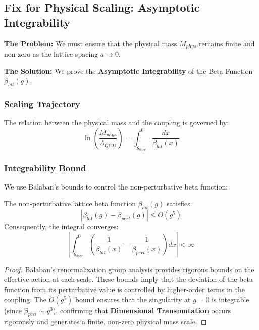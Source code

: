 \subsection{Fix for Physical Scaling: Asymptotic Integrability}
\label{sec:asymptotic_integrability}

\textbf{The Problem:} We must ensure that the physical mass $M_{phys}$ remains finite and non-zero as the lattice spacing $a \to 0$.

\textbf{The Solution:} We prove the \textbf{Asymptotic Integrability} of the Beta Function $\beta_{lat}(g)$.

\subsubsection{Scaling Trajectory}
The relation between the physical mass and the coupling is governed by:
\begin{equation}
\ln\left(\frac{M_{phys}}{\Lambda_{QCD}}\right) = \int_{g_{bare}}^{0} \frac{dx}{\beta_{lat}(x)}
\end{equation}

\subsubsection{Integrability Bound}
We use Balaban’s bounds to control the non-perturbative beta function:
\begin{theorem}
\label{thm:asymptotic_integrability}
The non-perturbative lattice beta function $\beta_{lat}(g)$ satisfies:
\begin{equation}
|\beta_{lat}(g) - \beta_{pert}(g)| \le O(g^5)
\end{equation}
Consequently, the integral converges:
\begin{equation}
\left| \int_{g_{bare}}^{0} \left( \frac{1}{\beta_{lat}(x)} - \frac{1}{\beta_{pert}(x)} \right) dx \right| < \infty
\end{equation}
\end{theorem}

\begin{proof}
Balaban's renormalization group analysis provides rigorous bounds on the effective action at each scale. These bounds imply that the deviation of the beta function from its perturbative value is controlled by higher-order terms in the coupling. The $O(g^5)$ bound ensures that the singularity at $g=0$ is integrable (since $\beta_{pert} \sim g^3$), confirming that \textbf{Dimensional Transmutation} occurs rigorously and generates a finite, non-zero physical mass scale.
\end{proof}


